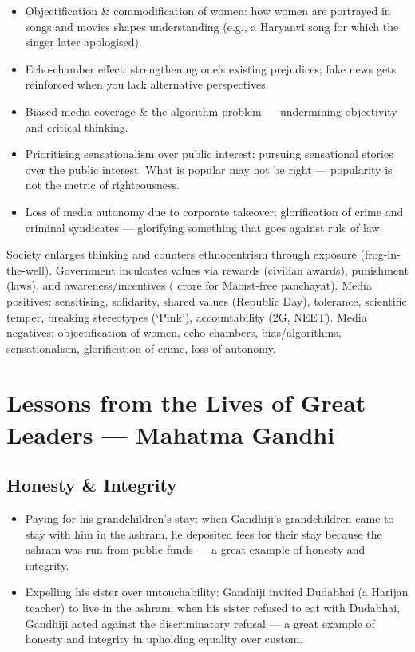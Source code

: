 \begin{itemize}
\item Objectification \& commodification of women: how women are portrayed in songs and movies shapes understanding (e.g., a Haryanvi song for which the singer later apologised).
\item Echo-chamber effect: strengthening one's existing prejudices; fake news gets reinforced when you lack alternative perspectives.
\item Biased media coverage \& the algorithm problem --- undermining objectivity and critical thinking.
\item Prioritising sensationalism over public interest: pursuing sensational stories over the public interest. What is popular may not be right --- popularity is not the metric of righteousness.
\item Loss of media autonomy due to corporate takeover; glorification of crime and criminal syndicates --- glorifying something that goes against rule of law.
\end{itemize}

\begin{QuickRevision}
Society enlarges thinking and counters ethnocentrism through exposure (frog-in-the-well). Government inculcates values via rewards (civilian awards), punishment (laws), and awareness/incentives ( crore for Maoist-free panchayat). Media positives: sensitising, solidarity, shared values (Republic Day), tolerance, scientific temper, breaking stereotypes (`Pink'), accountability (2G, NEET). Media negatives: objectification of women, echo chambers, bias/algorithms, sensationalism, glorification of crime, loss of autonomy.
\end{QuickRevision}

\section{Lessons from the Lives of Great Leaders --- Mahatma Gandhi}

\subsection{Honesty \& Integrity}

\begin{itemize}
\item Paying for his grandchildren's stay: when Gandhiji's grandchildren came to stay with him in the ashram, he deposited fees for their stay because the ashram was run from public funds --- a great example of honesty and integrity.
\item Expelling his sister over untouchability: Gandhiji invited Dudabhai (a Harijan teacher) to live in the ashram; when his sister refused to eat with Dudabhai, Gandhiji acted against the discriminatory refusal --- a great example of honesty and integrity in upholding equality over custom.
\end{itemize}

